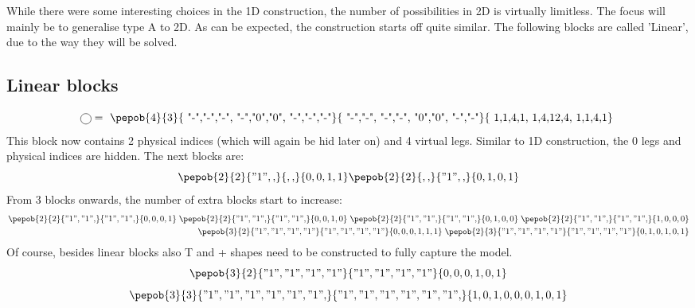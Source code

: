 While there were some interesting choices in the 1D construction, the number of possibilities in 2D is virtually limitless. The focus will mainly be to generalise type A to 2D. As can be expected, the construction starts off quite similar. The following blocks are called 'Linear', due to the way they will be solved.

\subsection{Linear blocks}

\begin{equation}
    \mpob{1}{ {,}  }{}{}{}{{,,}} = \vcenter{ \hbox{ \pepob{4}{3}{{
                        "-","-","-",
                        "-","0","0",
                        "-","-","-"}}{{
                        "-","-",
                        "-","-",
                        "0","0",
                        "-","-"}}{{
                        1,1,4,1,
                        1,4,12,4,
                        1,1,4,1}} }}
\end{equation}
This block now contains 2 physical indices (which will again be hid later on) and 4 virtual legs. Similar to 1D construction, the 0 legs and physical indices are hidden. The next blocks are:
\begin{equation}\label{2dblocksorder2}
    \pepob{2}{2}{{"1",,}}{{,,}}{{0,0,1,1}}  \pepob{2}{2}{{,,}}{{"1",,}}{{0,1,0,1}}
\end{equation}
From 3 blocks onwards, the number of extra blocks start to increase:
\begin{equation}
    \begin{split}
        \pepob{2}{2}{{"1","1",}}{{"1","1",}}{{0,0,0,1}} \;  \pepob{2}{2}{{"1","1",}}{{"1","1",}}{{0,0,1,0}} \; \pepob{2}{2}{{"1","1",}}{{"1","1",}}{{0,1,0,0}} \; \pepob{2}{2}{{"1","1",}}{{"1","1",}}{{1,0,0,0}}\\
        \pepob{3}{2}{{"1","1","1","1"}}{{"1","1","1","1"}}{{0,0,0,1,1,1}} \; \pepob{2}{3}{{"1","1","1","1"}}{{"1","1","1","1"}}{{0,1,0,1,0,1}}
    \end{split}
\end{equation}
Of course, besides linear blocks also T and + shapes need to be constructed to fully capture the model.
\begin{equation}
    \pepob{3}{2}{{"1","1","1","1"}}{{"1","1","1","1"}}{{0,0,0,1,0,1}}
\end{equation}
\begin{equation}
    \pepob{3}{3}{{"1","1","1","1","1","1",}}{{"1","1","1","1","1","1",}}{{1,0,1,0,0,0,1,0,1}}
\end{equation}
